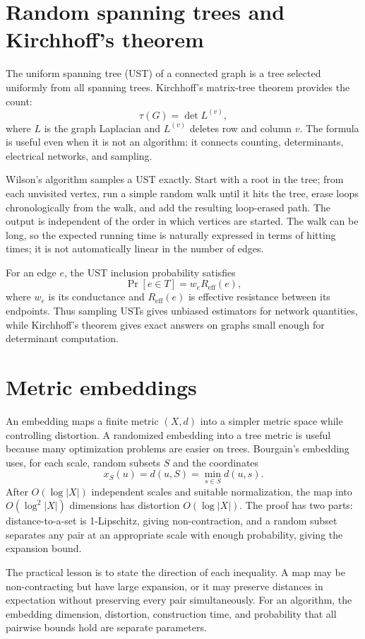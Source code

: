 \section{Random spanning trees and Kirchhoff's theorem}

The uniform spanning tree (UST) of a connected graph is a tree selected
uniformly from all spanning trees.  Kirchhoff's matrix-tree theorem provides
the count:
\[
 \tau(G)=\det L^{(v)},
\]
where $L$ is the graph Laplacian and $L^{(v)}$ deletes row and column $v$.
The formula is useful even when it is not an algorithm: it connects counting,
determinants, electrical networks, and sampling.

Wilson's algorithm samples a UST exactly.  Start with a root in the tree;
from each unvisited vertex, run a simple random walk until it hits the tree,
erase loops chronologically from the walk, and add the resulting loop-erased
path.  The output is independent of the order in which vertices are started.
The walk can be long, so the expected running time is naturally expressed in
terms of hitting times; it is not automatically linear in the number of edges.

For an edge $e$, the UST inclusion probability satisfies
\[
 \Pr[e\in T]=w_e R_{\mathrm{eff}}(e),
\]
where $w_e$ is its conductance and $R_{\mathrm{eff}}(e)$ is effective
resistance between its endpoints.  Thus sampling USTs gives unbiased
estimators for network quantities, while Kirchhoff's theorem gives exact
answers on graphs small enough for determinant computation.

\section{Metric embeddings}

An embedding maps a finite metric $(X,d)$ into a simpler metric space while
controlling distortion.  A randomized embedding into a tree metric is useful
because many optimization problems are easier on trees.  Bourgain's embedding
uses, for each scale, random subsets $S$ and the coordinates
\[
 x_{S}(u)=d(u,S)=\min_{s\in S}d(u,s).
\]
After $O(\log |X|)$ independent scales and suitable normalization, the map
into $O(\log^2 |X|)$ dimensions has distortion $O(\log |X|)$.  The proof has
two parts: distance-to-a-set is 1-Lipschitz, giving non-contraction, and a
random subset separates any pair at an appropriate scale with enough
probability, giving the expansion bound.

The practical lesson is to state the direction of each inequality.  A map may
be non-contracting but have large expansion, or it may preserve distances in
expectation without preserving every pair simultaneously.  For an algorithm,
the embedding dimension, distortion, construction time, and probability that
all pairwise bounds hold are separate parameters.


